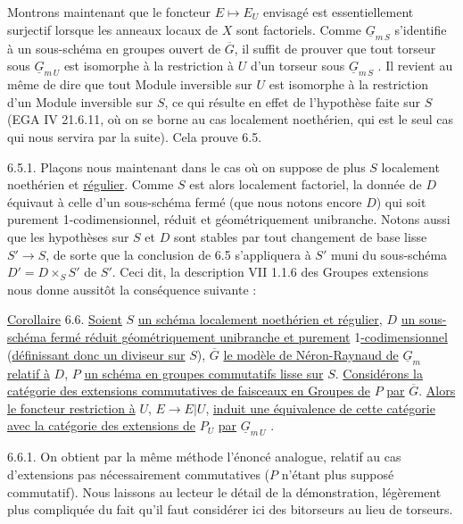 Montrons maintenant que le foncteur $E \longmapsto E_U$ envisagé est essentiellement surjectif lorsque les anneaux locaux de $X$ sont factoriels. Comme $\underline{G}_{m\,S}$ s'identifie à un sous-schéma en groupes ouvert de $\overline{G}$, il suffit de prouver que tout torseur sous $\underline{G}_{m\,U}$ est isomorphe à la restriction à $U$ d'un torseur sous $\underline{G}_{m\,S}$ . Il revient au même de dire que tout Module inversible sur $U$ est isomorphe à la restriction d'un Module inversible sur $S$, ce qui résulte en effet de l'hypothèse faite sur $S$ (EGA IV 21.6.11, où on se borne au cas localement noethérien, qui est le seul cas qui nous servira par la suite). Cela prouve 6.5.


6.5.1. Plaçons nous maintenant dans le cas où on suppose de plus $S$ localement noethérien et \underline{régulier}. Comme $S$ est alors localement factoriel, la donnée de $D$ équivaut à celle d'un sous-schéma fermé (que nous notons encore $D$) qui soit purement 1-codimensionnel, réduit et géométriquement unibranche. Notons aussi que les hypothèses sur $S$ et $D$ sont stables par tout changement de base lisse $S' \longrightarrow S$, de sorte que la conclusion de 6.5 s'appliquera à $S'$ muni du sous-schéma $D' = D \times_S S'$ de $S'$. Ceci dit, la description VII 1.1.6 des Groupes extensions nous donne aussitôt la conséquence suivante :

\underline{Corollaire} 6.6. \underline{Soient} $S$ \underline{un schéma localement noethérien et régulier}, $D$ \underline{un sous-schéma fermé réduit géométriquement unibranche et purement} 1\underline{-codimensionnel} (\underline{définissant donc un diviseur sur} $S$), $\overline{G}$ \underline{le modèle de Néron-Raynaud de} $\underline{G}_m$ \underline{relatif à} $D$, $P$ \underline{un schéma en groupes commutatifs lisse sur} $S$. \underline{Considérons la catégorie des extensions commutatives de faisceaux en Groupes de} $P$ \underline{par} $\overline{G}$. \underline{Alors le foncteur restriction à} $U$, $E \longrightarrow E|U$, \underline{induit une équivalence de cette catégorie avec la catégorie des extensions de} $P_U$ \underline{par} $\underline{G}_{m\,U}$ .

6.6.1. On obtient par la même méthode l'énoncé analogue, relatif au cas d'extensions pas nécessairement commutatives ($P$ n'étant plus supposé commutatif). Nous laissons au lecteur le détail de la démonstration, légèrement plus compliquée du fait qu'il faut considérer ici des bitorseurs au lieu de torseurs.

